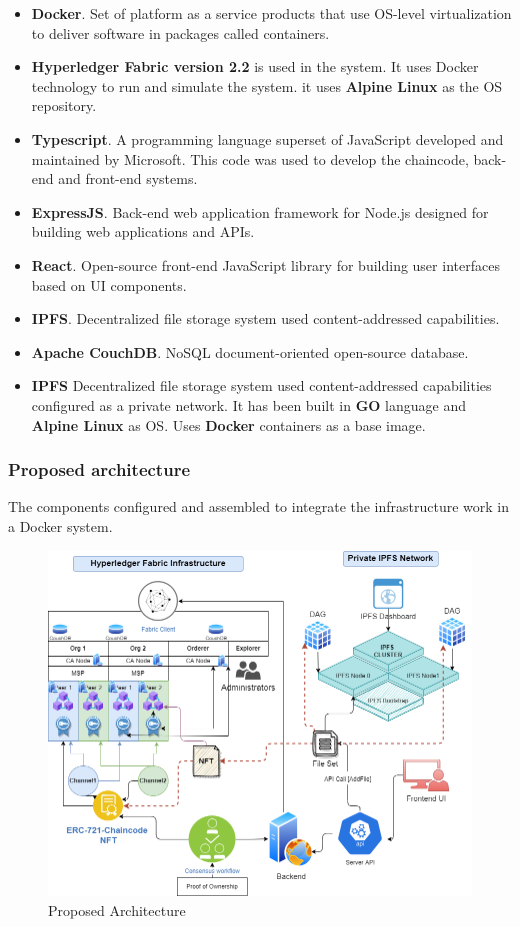 \begin{itemize}
    \item \textbf{Docker}. Set of platform as a service products that use OS-level virtualization to deliver software in packages called containers.
    \item \textbf{Hyperledger Fabric version 2.2} is used in the system. It uses Docker technology to run and simulate the system. it uses \textbf{Alpine Linux} as the \ac{OS} repository.
    \item \textbf{Typescript}. A programming language superset of JavaScript developed and maintained by Microsoft. This code was used to develop the chaincode, back-end and front-end systems.
    \item \textbf{ExpressJS}. Back-end web application framework for Node.js designed for building web applications and APIs.
    \item \textbf{React}. Open-source front-end JavaScript library for building user interfaces based on UI components.
    \item \textbf{IPFS}. Decentralized file storage system used content-addressed capabilities.
    \item \textbf{Apache CouchDB}. NoSQL document-oriented open-source database.
    \item \textbf{\ac{IPFS}} Decentralized file storage system used content-addressed capabilities configured as a private network. It has been built in \textbf{GO} language and  \textbf{Alpine Linux} as \ac{OS}. Uses \textbf{Docker} containers as a base image.
\end{itemize}


\subsubsection{Proposed architecture}
The components configured and assembled to integrate the infrastructure work in a Docker system.

\begin{figure}[!h]
    \centering
    \includegraphics[width=15cm]{img/Hyperledger-NFT-Architecture.png}
    \caption{Proposed Architecture}
    \label{fig:SystemArch}
\end{figure}

